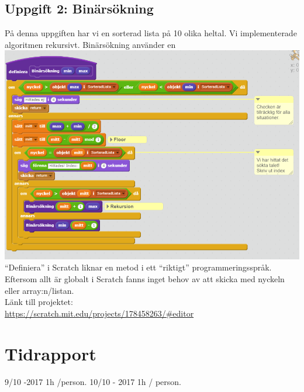 \documentclass[12pt,a4paper]{article}
\begin{document}
\subsection{Uppgift 2: Binärsökning}
På denna uppgiften har vi en sorterad lista på 10 olika heltal.
Vi implementerade algoritmen rekursivt. Binärsökning använder en  \\
\includegraphics[scale=0.65]{binaryimpl}
\\ ``Definiera'' i Scratch liknar en metod i ett ``riktigt'' programmeringsspråk. Eftersom allt är globalt i Scratch fanns inget behov av att skicka med nyckeln eller array:n/listan.   \\
Länk till projektet: \\ \url{ https://scratch.mit.edu/projects/178458263/#editor }
\section{Tidrapport}
9/10 -2017 1h /person. 
10/10 - 2017 1h / person. 
\end{document}
